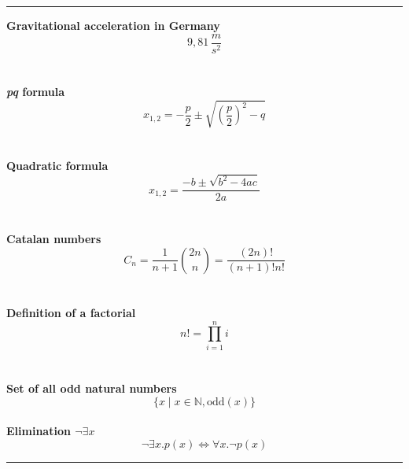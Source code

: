 \documentclass[a4paper, ngerman]{report}
\begin{document}
\thispagestyle{empty}

\hrule
\begin{center}

\textbf{Gravitational acceleration in Germany}
$$9,81\,\frac{m}{s^2}$$ \\
~ \\

\textbf {\textit{pq} formula}
$$x_{1,2} = - \frac{p}{2} \pm \sqrt{\left(\frac{p}{2}\right)^2 - q}$$ \\
~ \\

\textbf{Quadratic formula} 
$$x_{1,2} = \frac{-b \pm \sqrt{b^2 - 4ac}}{2a}$$ \\
~ \\

\textbf{Catalan numbers}
\begin{equation*} C_n = \frac{1}{n+1} {2n \choose n} = \frac{(2n)!}{(n+1)!n!} \end{equation*} \\
~ \\

\textbf{Definition of a factorial} 
$$n! = \prod_{i=1}^{n} i$$ \\
~ \\

\textbf{Set of all odd natural numbers}
$$\{ x \mid x \in \mathds{N}, \mathrm{odd}(x) \}$$
~ \\

\textbf{Elimination $\neg\exists x$}
$$\neg\exists x . p(x) \Leftrightarrow \forall x . \neg p(x)$$
\end{center}

\hrule
\end{document}
